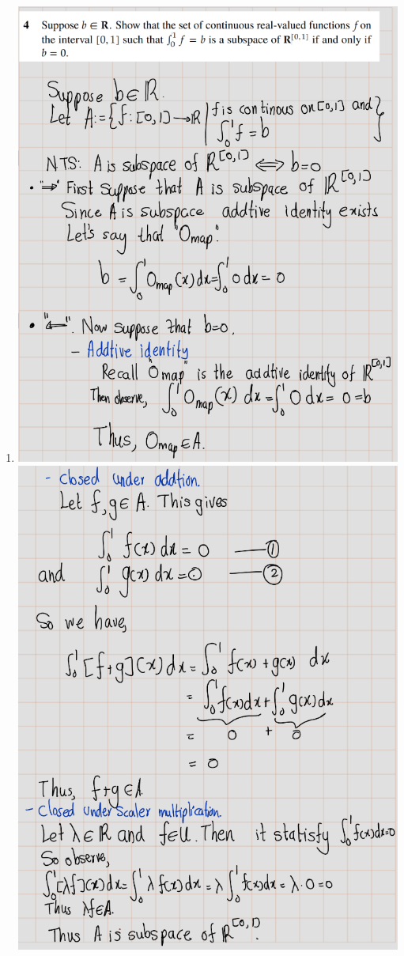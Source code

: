 \documentclass[
]{book}
\providecommand{\tightlist}{%
  \setlength{\itemsep}{0pt}\setlength{\parskip}{0pt}}
\theoremstyle{definition}
\theoremstyle{definition}
\theoremstyle{definition}
\theoremstyle{definition}
\theoremstyle{remark}
\begin{document}
\begin{enumerate}
\def\labelenumi{\arabic{enumi}.}
\setcounter{enumi}{3}
\tightlist
\item
  \includegraphics{fig/Ex1C/Ex4.png}
  \includegraphics{fig/Ex1C/Ex4-2.png}

\end{enumerate}
\end{document}
